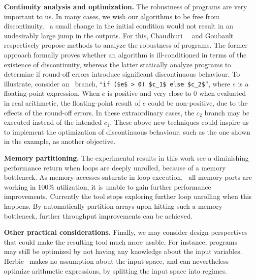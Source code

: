 \textbf{Continuity analysis and optimization.} The robustness of programs
are very important to us.  In many cases, we wish our algorithms to be
free from discontinuity, \ie~a small change in the initial condition
would not result in an undesirably large jump in the outputs.  For this,
Chaudhuri~\etal~\cite{chaudhuri11} and Goubault~\etal~\cite{goubault13}
respectively propose methods to analyze the robustness of programs.  The
former approach formally proves whether an algorithm is ill-conditioned in
terms of the existence of discontinuity, whereas the latter statically analyze
programs to determine if round-off errors introduce significant discontinuous
behaviour.  To illustrate, consider an \iflit~branch,
``\lstinline[basicstyle=\tt]{if ($e$ > 0) $c_1$ else $c_2$}'', where $e$
is a floating-point expression.  When $e$ is positive and very close to
$0$ when evaluated in real arithmetic, the floating-point result of $e$
could be non-positive, due to the effects of the round-off errors.  In
these extraordinary cases, the $c_2$ branch may be executed instead of the
intended $c_1$.  These above new techniques could inspire us to implement the
optimization of discontinuous behaviour, such as the one shown in the example,
as another objective.

\textbf{Memory partitioning.} The experimental results in this work see a
diminishing performance return when loops are deeply unrolled, because of a
memory bottleneck.  As memory accesses saturate in loop execution, \ie~all
memory ports are working in 100\% utilization, it is unable to gain further
performance improvements.  Currently the tool stops exploring further loop
unrolling when this happens.  By automatically partition arrays upon hitting
such a memory bottleneck, further throughput improvements can be achieved.

\textbf{Other practical considerations.}  Finally, we may consider design
perspectives that could make the resulting tool much more usable.  For
instance, programs may still be optimized by not having any knowledge about the
input variables.  Herbie~\cite{panchekha15} makes no assumption about the input
space, and can nevertheless optimize arithmetic expressions, by splitting the
input space into regimes.




